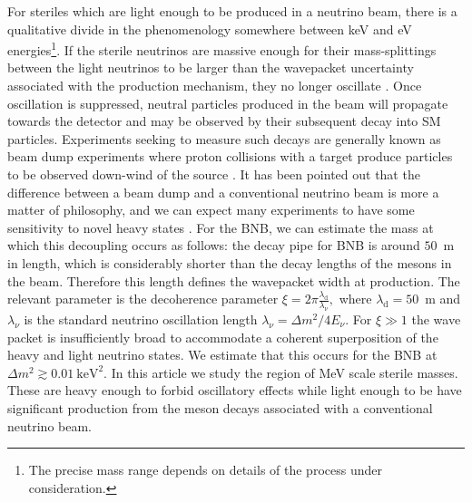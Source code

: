 \documentclass[11pt, a4paper]{article}
\def\ster{\ensuremath N}
\begin{document}
For steriles which are light enough to be produced in a neutrino beam,
%
%
there is a qualitative divide in the phenomenology somewhere between keV and eV
energies\footnote{The precise mass range depends on details of the process
under consideration.}. If the sterile neutrinos are massive enough for their
mass-splittings between the light neutrinos to be larger than the wavepacket
uncertainty associated with the production mechanism, they no longer oscillate
\cite{Akhmedov:2009rb}.  
%
Once oscillation is suppressed, neutral particles produced in the beam will
propagate towards the detector and may be observed by their subsequent decay
into SM particles. Experiments seeking to measure such decays are generally
known as beam dump experiments where proton collisions with a target produce
particles to be observed down-wind of the source \cite{CooperSarkar:1985nh,
Bergsma:1985is, Vaitaitis:1999wq, Bernardi:1985ny, Bernardi:1987ek,
Anelli:2015pba, Alekhin:2015byh}. It has been pointed out that the difference
between a beam dump and a conventional neutrino beam is more a matter of
philosophy, and we can expect many experiments to have some sensitivity to
novel heavy states \cite{Gorbunov:2007ak, Asaka:2012bb, Adams:2013qkq}. 
%
For the BNB, we can estimate the mass at which this decoupling occurs as
follows: the decay pipe for BNB is around $50$~m in length, which is
considerably shorter than the decay lengths of the mesons in the beam.
Therefore this length defines the wavepacket width at production.  The relevant
parameter is the decoherence parameter \cite{Akhmedov:2009rb, Hernandez:2011rs}
%
$\xi = 2\pi \frac{\lambda_\text{d}}{\lambda_\nu},$
%
where $\lambda_\text{d} = 50$~m and $\lambda_\nu$ is the standard neutrino
oscillation length $\lambda_\nu = \Delta m^2/4E_\nu$. For $\xi\gg1$ the wave
packet is insufficiently broad to accommodate a coherent superposition of the
heavy and light neutrino states. We estimate that this occurs for the BNB at 
%
$ \Delta m^2 \gtrsim 0.01~\text{keV}^2.$
%
In this article we study the region of MeV scale sterile masses. These are
heavy enough to forbid oscillatory effects while light enough to be have
significant production from the meson decays associated with a conventional
neutrino beam. 
\end{document}
